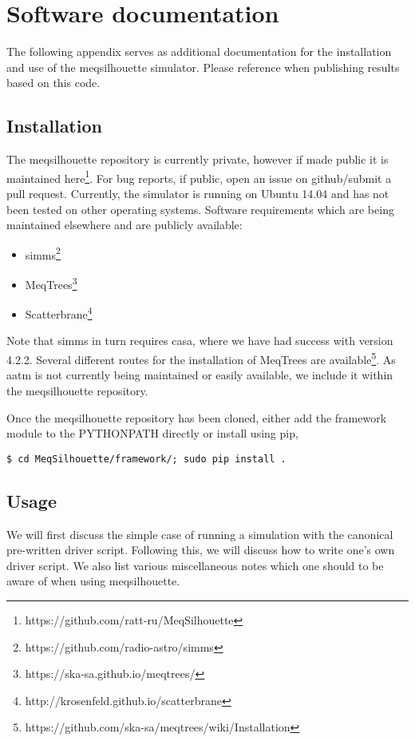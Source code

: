 \chapter{Software documentation}
The following appendix serves as additional documentation for the installation and use of the {\sc meqsilhouette} simulator. Please reference \citep{Blecher_2016} when publishing results based on this code.

\section{Installation}

The {\sc meqsilhouette} repository is currently private, however if made public it is maintained here\footnote{https://github.com/ratt-ru/MeqSilhouette}. For bug reports, if public, open an issue on github/submit a pull request. Currently, the simulator is running on {\sc Ubuntu 14.04} and has not been tested on other operating systems. Software requirements which are being maintained elsewhere and are publicly available: 
\begin{itemize}
 \item {\sc simms}\footnote{https://github.com/radio-astro/simms}
 \item {\sc MeqTrees}\footnote{https://ska-sa.github.io/meqtrees/} 
 \item {\sc Scatterbrane}\footnote{http://krosenfeld.github.io/scatterbrane}
\end{itemize}

Note that {\sc simms} in turn requires {\sc casa}, where we have had success with version 4.2.2. Several different routes for the installation of {\sc MeqTrees} are available\footnote{https://github.com/ska-sa/meqtrees/wiki/Installation}. As {\sc aatm} is not currently being maintained or easily available, we include it within the {\sc meqsilhouette} repository. 


Once the {\sc meqsilhouette} repository has been cloned, either add the framework module to the PYTHONPATH directly or install using pip,
\begin{verbatim}
$ cd MeqSilhouette/framework/; sudo pip install .
\end{verbatim}
\section{Usage}

We will first discuss the simple case of running a simulation with the canonical pre-written driver script. Following this, we will discuss how to write one's own driver script. We also list various miscellaneous notes which one should to be aware of when using {\sc meqsilhouette}.
